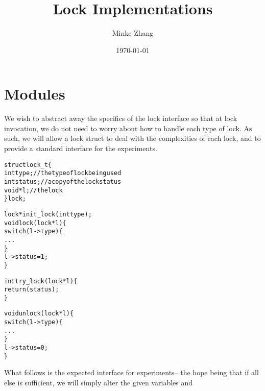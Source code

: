 \documentclass{article}
\newcommand{\tb}[1]{\textbf{#1}}
\newcommand{\cpart}[1]{\newblock{\LARGE {\\\\#1}}}
\begin{document}

\title{\tb{Lock Implementations}}
\author{Minke Zhang\hspace*{-\tabcolsep}}
\date{\today}

\begingroup
\let\center\flushright
\let\endcenter\endflushright
\maketitle
\endgroup

\section{Modules}

\cpart{Locks}

We wish to abstract away the specifics of the lock interface so that at lock invocation, we do not need to worry about how to handle each type of lock. As such, we 
will allow a lock struct to deal with the complexities of each lock, and to provide a standard interface for the experiments.

\begin{alltt}
struct lock_t \{
  int type;             // the type of lock being used
  int status;           // a copy of the lock status
  void *l;              // the lock
\} lock;

lock *init_lock(int type);
void lock(lock *l) \{
  switch(l->type) \{
    ...
  \}
  l->status = 1;
\}

int try_lock(lock *l) \{
  return(status);
\}

void unlock(lock *l) \{
  switch(l->type) \{
    ...
  \}
  l->status = 0;
\}
\end{alltt}

\cpart{Experiment Interfaces}

What follows is the expected interface for experiments-- the hope being that if all else is sufficient, we will simply alter the given variables and
\end{document}
